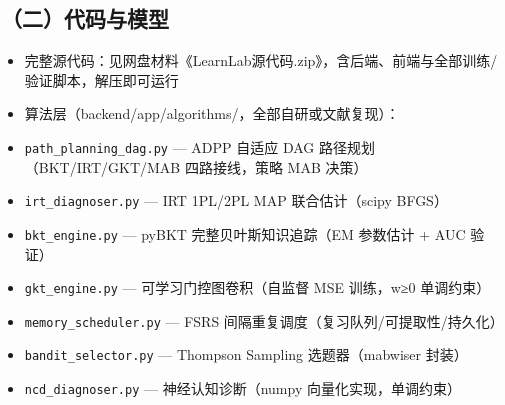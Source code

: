 \documentclass[zihao=-4,a4paper,UTF8,fontset=windows]{ctexart}
\begin{document}
\subsection{（二）代码与模型}
\begin{itemize}[leftmargin=2em,itemsep=0pt,topsep=0pt]
\item 完整源代码：见网盘材料《LearnLab源代码.zip》，含后端、前端与全部训练/验证脚本，解压即可运行
\end{itemize}
\begin{itemize}[leftmargin=2em,itemsep=0pt,topsep=0pt]
\item 算法层（backend/app/algorithms/，全部自研或文献复现）：
\end{itemize}
\begin{itemize}[leftmargin=2em,itemsep=0pt,topsep=0pt]
\item \texttt{path\_\allowbreak{}planning\_\allowbreak{}dag.\allowbreak{}py} — ADPP 自适应 DAG 路径规划（BKT/IRT/GKT/MAB 四路接线，策略 MAB 决策）
\end{itemize}
\begin{itemize}[leftmargin=2em,itemsep=0pt,topsep=0pt]
\item \texttt{irt\_\allowbreak{}diagnoser.\allowbreak{}py} — IRT 1PL/2PL MAP 联合估计（scipy BFGS）
\end{itemize}
\begin{itemize}[leftmargin=2em,itemsep=0pt,topsep=0pt]
\item \texttt{bkt\_\allowbreak{}engine.\allowbreak{}py} — pyBKT 完整贝叶斯知识追踪（EM 参数估计 + AUC 验证）
\end{itemize}
\begin{itemize}[leftmargin=2em,itemsep=0pt,topsep=0pt]
\item \texttt{gkt\_\allowbreak{}engine.\allowbreak{}py} — 可学习门控图卷积（自监督 MSE 训练，w≥0 单调约束）
\end{itemize}
\begin{itemize}[leftmargin=2em,itemsep=0pt,topsep=0pt]
\item \texttt{memory\_\allowbreak{}scheduler.\allowbreak{}py} — FSRS 间隔重复调度（复习队列/可提取性/持久化）
\end{itemize}
\begin{itemize}[leftmargin=2em,itemsep=0pt,topsep=0pt]
\item \texttt{bandit\_\allowbreak{}selector.\allowbreak{}py} — Thompson Sampling 选题器（mabwiser 封装）
\end{itemize}
\begin{itemize}[leftmargin=2em,itemsep=0pt,topsep=0pt]
\item \texttt{ncd\_\allowbreak{}diagnoser.\allowbreak{}py} — 神经认知诊断（numpy 向量化实现，单调约束）
\end{itemize}
\end{document}
